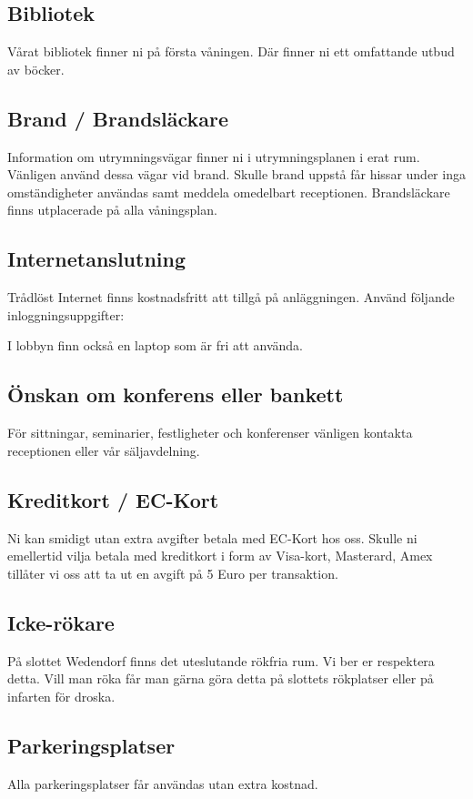 \documentclass{article}
\begin{document}
\subsection{Bibliotek}
Vårat bibliotek finner ni på första våningen. Där finner ni ett omfattande utbud av böcker.

\subsection{Brand / Brandsläckare}
Information om utrymningsvägar finner ni i utrymningsplanen i erat rum. Vänligen använd dessa vägar vid brand.
Skulle brand uppstå får hissar under inga omständigheter användas samt meddela omedelbart receptionen.
Brandsläckare finns utplacerade på alla våningsplan.

\subsection{Internetanslutning}
Trådlöst Internet finns kostnadsfritt att tillgå på anläggningen. Använd följande inloggningsuppgifter:

I lobbyn finn också en laptop som är fri att använda.

\subsection{Önskan om konferens eller bankett}
För sittningar, seminarier, festligheter och konferenser vänligen kontakta receptionen eller vår säljavdelning.

\subsection{Kreditkort / EC-Kort}
Ni kan smidigt utan extra avgifter betala med EC-Kort hos oss. Skulle ni emellertid vilja betala med kreditkort
i form av Visa-kort, Masterard, Amex tillåter vi oss att ta ut en avgift på 5 Euro per transaktion.

\subsection{Icke-rökare}
På slottet Wedendorf finns det uteslutande rökfria rum. Vi ber er respektera detta. Vill man röka får man gärna
göra detta på slottets rökplatser eller på infarten för droska.

\subsection{Parkeringsplatser}
Alla parkeringsplatser får användas utan extra kostnad.
\end{document}
